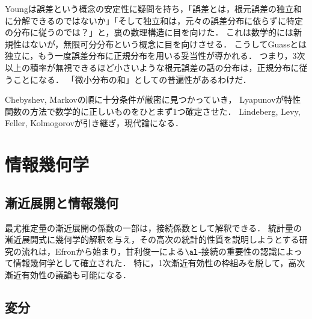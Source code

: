 \documentclass[uplatex,dvipdfmx]{jsreport}
\begin{document}
\begin{history}[誤差とは何か]
    Youngは誤差という概念の安定性に疑問を持ち，「誤差とは，根元誤差の独立和に分解できるのではないか」「そして独立和は，元々の誤差分布に依らずに特定の分布に従うのでは？」と，裏の数理構造に目を向けた．
    これは数学的には新規性はないが，無限可分分布という概念に目を向けさせる．
    こうしてGuassとは独立に，もう一度誤差分布に正規分布を用いる妥当性が導かれる．
    つまり，3次以上の積率が無視できるほど小さいような根元誤差の話の分布は，正規分布に従うことになる．
    「微小分布の和」としての普遍性があるわけだ．
\end{history}

\begin{history}
    Chebyshev, Markovの順に十分条件が厳密に見つかっていき，
    Lyapunovが特性関数の方法で数学的に正しいものをひとまず1つ確定させた．
    Lindeberg, Levy, Feller, Kolmogorovが引き継ぎ，現代論になる．
\end{history}

\chapter{情報幾何学}

\section{漸近展開と情報幾何}

\begin{tcolorbox}[colframe=ForestGreen, colback=ForestGreen!10!white,breakable,colbacktitle=ForestGreen!40!white,coltitle=black,fonttitle=\bfseries\sffamily,
title=]
    最尤推定量の漸近展開の係数の一部は，接続係数として解釈できる．
    統計量の漸近展開式に幾何学的解釈を与え，その高次の統計的性質を説明しようとする研究の流れは，Efronから始まり，甘利俊一による$\al$-接続の重要性の認識によって情報幾何学として確立された．
    特に，1次漸近有効性の枠組みを脱して，高次漸近有効性の議論も可能になる．
\end{tcolorbox}

\section{変分}

\begin{tcolorbox}[colframe=ForestGreen, colback=ForestGreen!10!white,breakable,colbacktitle=ForestGreen!40!white,coltitle=black,fonttitle=\bfseries\sffamily,
title=]
    
\end{tcolorbox}
\end{document}
